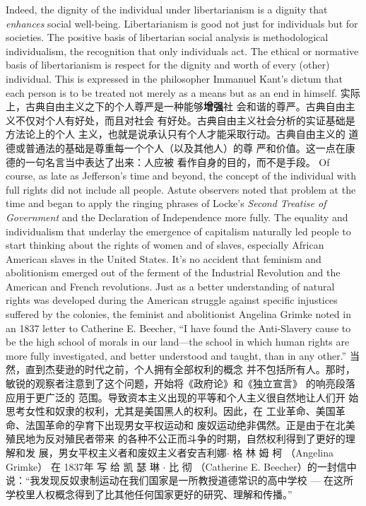 \begin{paracol}{2}
Indeed, the dignity of the individual under libertarianism is a
dignity that \textit{enhances} social well-being. Libertarianism is good
not just for individuals but for societies. The positive basis of
libertarian social analysis is methodological individualism, the
recognition that only individuals act. The ethical or normative
basis of libertarianism is respect for the dignity and worth of
every (other) individual. This is expressed in the philosopher
Immanuel Kant's dictum that each person is to be treated not
merely as a means but as an end in himself.
\switchcolumn
实际上，古典自由主义之下的个人尊严是一种能够\textbf{增强}社
会和谐的尊严。古典自由主义不仅对个人有好处，而且对社会
有好处。古典自由主义社会分析的实证基础是方法论上的个人
主义，也就是说承认只有个人才能采取行动。古典自由主义的
道德或普通法的基础是尊重每一个个人（以及其他人）的尊
严和价值。这一点在康德的一句名言当中表达了出来：人应被
看作自身的目的，而不是手段。
\switchcolumn*
Of course, as late as Jefferson's time and beyond, the concept
of the individual with full rights did not include all people. Astute observers noted that problem at the time and began to
apply the ringing phrases of Locke's \textit{Second Treatise of Government} and the Declaration of Independence more fully. The equality
and individualism that underlay the emergence of capitalism
naturally led people to start thinking about the rights of
women and of slaves, especially African American slaves in the
United States. It's no accident that feminism and abolitionism
emerged out of the ferment of the Industrial Revolution and the
American and French revolutions. Just as a better understanding of natural rights was developed during the American struggle against specific injustices suffered by the colonies, the
feminist and abolitionist Angelina Grimke noted in an 1837
letter to Catherine E. Beecher, ``I have found the Anti-Slavery
cause to be the high school of morals in our land---the school in
which human rights are more fully investigated, and better understood and taught, than in any other.''
\switchcolumn
当然，直到杰斐逊的时代之前，个人拥有全部权利的概念
并不包括所有人。那时，敏锐的观察者注意到了这个问题，开始将《政府论》和《独立宣言》 的响亮段落应用于更广泛的
范围。导致资本主义出现的平等和个人主义很自然地让人们开
始思考女性和奴隶的权利，尤其是美国黑人的权利。因此，在
工业革命、美国革命、法国革命的孕育下出现男女平权运动和
废奴运动绝非偶然。正是由于在北美殖民地为反对殖民者带来
的各种不公正而斗争的时期，自然权利得到了更好的理解和发
展，男女平权主义者和废奴主义者安吉利娜$\cdot$ 格 林 姆 柯 （An­gelina Grimke） 在 1837年 写 给 凯 瑟 琳 $\cdot$ 比 彻 （Catherine  E. Beecher）的一封信中说：“我发现反奴隶制运动在我们国家是一所教授道德常识的高中学校 --- 在这所学校里人权概念得到了比其他任何国家更好的研究、理解和传播。”


\end{paracol}
